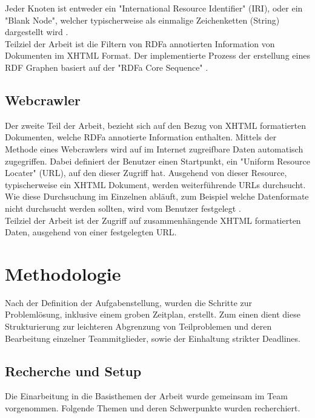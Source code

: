 \documentclass[hidelinks, a4paper, 11pt]{article} %
\begin{document}
Jeder Knoten ist entweder ein "International Resource Identifier" (IRI), oder ein "Blank Node", welcher typischerweise als einmalige Zeichenketten (String) dargestellt wird \cite{adida2008rdfa}. \\

Teilziel der Arbeit ist die Filtern von RDFa annotierten Information von Dokumenten im XHTML Format. Der implementierte Prozess der erstellung eines RDF Graphen basiert auf der "RDFa Core Sequence" \cite{rdfaSequence}.

\subsection{Webcrawler}

Der zweite Teil der Arbeit, bezieht sich auf den Bezug von XHTML formatierten Dokumenten, welche RDFa annotierte Information enthalten. Mittels der Methode eines Webcrawlers wird auf im Internet zugreifbare Daten automatisch zugegriffen. Dabei definiert der Benutzer einen Startpunkt, ein "Uniform Resource Locater" (URL), auf den dieser Zugriff hat. Ausgehend von dieser Resource, typischerweise ein XHTML Dokument, werden weiterf\"uhrende URLs durchsucht. Wie diese Durchsuchung im Einzelnen abl\"auft, zum Beispiel welche Datenformate nicht durchsucht werden sollten, wird vom Benutzer festgelegt \cite{pinkerton2000webcrawler}. \\

Teilziel der Arbeit ist der Zugriff auf zusammenh\"angende XHTML formatierten Daten, ausgehend von einer festgelegten URL.



\section{Methodologie}

Nach der Definition der Aufgabenstellung, wurden die Schritte zur Probleml\"osung, inklusive einem groben Zeitplan, erstellt. Zum einen dient diese Strukturierung zur leichteren Abgrenzung von Teilproblemen und deren Bearbeitung einzelner Teammitglieder, sowie der Einhaltung strikter Deadlines.

\subsection{Recherche und Setup}

Die Einarbeitung in die Basisthemen der Arbeit wurde gemeinsam im Team vorgenommen. Folgende Themen und deren Schwerpunkte wurden recherchiert.
\end{document}
